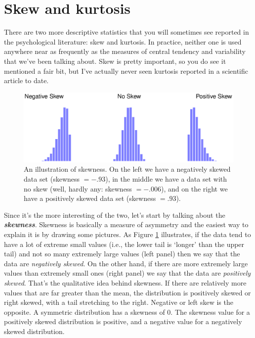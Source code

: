 \documentclass[
]{book}
\begin{document}
\hypertarget{skewkurt}{%
\section{Skew and kurtosis}\label{skewkurt}}

There are two more descriptive statistics that you will sometimes see reported in the psychological literature: skew and kurtosis. In practice, neither one is used anywhere near as frequently as the measures of central tendency and variability that we've been talking about. Skew is pretty important, so you do see it mentioned a fair bit, but I've actually never seen kurtosis reported in a scientific article to date.

\begin{figure}
\centering
\includegraphics{img/descriptives/skewness.eps}
\caption{\label{fig:skewness}An illustration of skewness. On the left we have a negatively skewed data set (skewness \(= -.93\)), in the middle we have a data set with no skew (well, hardly any: skewness \(= -.006\)), and on the right we have a positively skewed data set (skewness \(= .93\)).}
\end{figure}

Since it's the more interesting of the two, let's start by talking about the \textbf{\emph{skewness}}. Skewness is basically a measure of asymmetry and the easiest way to explain it is by drawing some pictures. As Figure \ref{fig:skewness} illustrates, if the data tend to have a lot of extreme small values (i.e., the lower tail is `longer' than the upper tail) and not so many extremely large values (left panel) then we say that the data are \emph{negatively skewed}. On the other hand, if there are more extremely large values than extremely small ones (right panel) we say that the data are \emph{positively skewed}. That's the qualitative idea behind skewness. If there are relatively more values that are far greater than the mean, the distribution is positively skewed or right skewed, with a tail stretching to the right. Negative or left skew is the opposite. A symmetric distribution has a skewness of 0. The skewness value for a positively skewed distribution is positive, and a negative value for a negatively skewed distribution.
\end{document}

